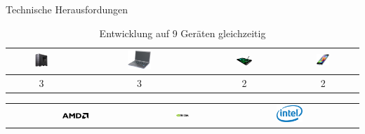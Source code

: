 \begin{frame}{Technische Herausfordungen}
\onetoone
{
	\begin{table}[h]
	\begin{tabular}{c|c|c|c}
		\includegraphics[width=0.2\textwidth, height=0.1\textheight, keepaspectratio]{images/tower} &
		\includegraphics[width=0.2\textwidth, height=0.1\textheight, keepaspectratio]{images/laptops} &
		\includegraphics[width=0.2\textwidth, height=0.1\textheight, keepaspectratio]{images/tablets} & 
		\includegraphics[width=0.2\textwidth, height=0.1\textheight, keepaspectratio]{images/smartphones} \\ \hline
		3 & 3 & 2 & 2
	\end{tabular}
	\caption{Entwicklung auf 9 Geräten gleichzeitig}
	\end{table}
}
{
	\begin{table}[h]
	\begin{tabular}{c|c|c}
		\includegraphics[width=0.2\textwidth, height=0.1\textheight, keepaspectratio]{images/AMD_Logo} &
		\includegraphics[width=0.2\textwidth, height=0.1\textheight, keepaspectratio]{images/nvidia-logo} &
		\includegraphics[width=0.2\textwidth, height=0.1\textheight, keepaspectratio]{images/Intel-logo}  

\end{tabular}
\end{table}}
\end{frame}
